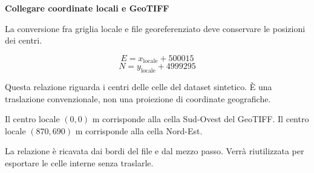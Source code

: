\documentclass[12pt,aspectratio=1610]{beamer}
\newcommand{\PBody}[1]{\par{\fontsize{11.3}{14.8}\selectfont #1\par}}
\newcommand{\PSmall}[1]{\par{\fontsize{9.8}{13.1}\selectfont #1\par}}
\newcommand{\PInfo}[1]{%
\begin{tcolorbox}[enhanced,arc=1.6mm,boxrule=.55pt,colback=GeoTint,
 colframe=Rule!80!Classical,left=2.3mm,right=2.3mm,top=2mm,bottom=2mm,
 before skip=1mm,after skip=1mm]
\PSmall{#1}\end{tcolorbox}}
\begin{document}
\begin{frame}[plain]\hypertarget{slide17}{}
\begin{lrbox}{\TitleBox}
\begin{minipage}[t]{17.7cm}\raggedright\color{Ink}\fontsize{11.3}{14.8}\selectfont
\color{Navy}\bfseries\fontsize{20.6}{24.5}\selectfont Collegare coordinate locali e GeoTIFF
\end{minipage}\end{lrbox}

\begin{lrbox}{\RecallBox}
\begin{minipage}[t]{14.3cm}\raggedright\color{Ink}\fontsize{11.3}{14.8}\selectfont
\fontsize{10.3}{13.8}\selectfont La conversione fra griglia locale e file georeferenziato deve conservare le posizioni dei centri.
\end{minipage}\end{lrbox}

\begin{lrbox}{\PilotLeftBox}
\begin{minipage}[t]{10.05cm}\raggedright\color{Ink}\fontsize{11.3}{14.8}\selectfont
\[E=x_{\mathrm{locale}}+500015\]
\[N=y_{\mathrm{locale}}+4999295\]
\PInfo{Questa relazione riguarda i centri delle celle del dataset sintetico. È una traslazione convenzionale, non una proiezione di coordinate geografiche.}

\end{minipage}\end{lrbox}

\begin{lrbox}{\PilotRightBox}
\begin{minipage}[t]{7.55cm}\raggedright\color{Ink}\fontsize{11.3}{14.8}\selectfont
\PBody{Il centro locale $(0,0)$ m corrisponde alla cella Sud-Ovest del GeoTIFF. Il centro locale $(870,690)$ m corrisponde alla cella Nord-Est.}
\vspace{2.5mm}
\PBody{La relazione è ricavata dai bordi del file e dal mezzo passo. Verrà riutilizzata per esportare le celle interne senza traslarle.}
\vspace{2.5mm}

\end{minipage}\end{lrbox}


\end{frame}
\end{document}
